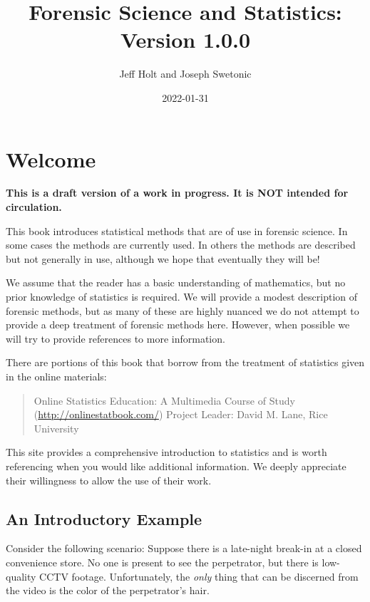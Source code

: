 \documentclass[
]{book}
\title{Forensic Science and Statistics: Version 1.0.0}
\author{Jeff Holt and Joseph Swetonic}
\date{2022-01-31}
\begin{document}
\maketitle

{
\setcounter{tocdepth}{1}
\tableofcontents
}
\hypertarget{welcome}{%
\chapter{Welcome}\label{welcome}}

\textbf{This is a draft version of a work in progress. It is NOT intended for circulation.}

This book introduces statistical methods that are of use in forensic science.
In some cases the methods are currently used.
In others the methods are described but not generally in use,
although we hope that eventually they will be!

We assume that the reader has a basic understanding of mathematics, but no prior
knowledge of statistics is required.
We will provide a modest description of forensic methods, but as many of these are
highly nuanced we do not attempt to
provide a deep treatment of forensic methods here. However, when possible we will
try to provide references to more information.

There are portions of this book that borrow from the treatment of statistics
given in the online materials:

\begin{quote}
Online Statistics Education: A Multimedia Course of Study (\url{http://onlinestatbook.com/})
Project Leader: David M. Lane, Rice University
\end{quote}

This site provides a comprehensive introduction to statistics and is worth referencing when you would like additional information.
We deeply appreciate their willingness to allow the use of their work.

\hypertarget{an-introductory-example}{%
\section{An Introductory Example}\label{an-introductory-example}}

Consider the following scenario:
Suppose there is a late-night break-in at a closed convenience store.
No one is present to see the perpetrator, but there is low-quality CCTV footage.
Unfortunately, the \emph{only} thing that can be discerned from the video is the
color of the perpetrator's hair.
\end{document}
